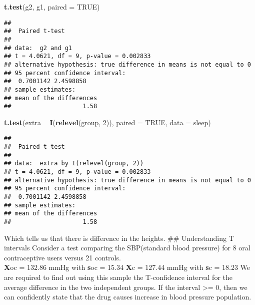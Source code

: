 \documentclass[
]{article}
\newenvironment{Shaded}{\begin{snugshade}}{\end{snugshade}}
\newcommand{\DataTypeTok}[1]{\textcolor[rgb]{0.13,0.29,0.53}{#1}}
\newcommand{\DecValTok}[1]{\textcolor[rgb]{0.00,0.00,0.81}{#1}}
\newcommand{\KeywordTok}[1]{\textcolor[rgb]{0.13,0.29,0.53}{\textbf{#1}}}
\newcommand{\NormalTok}[1]{#1}
\newcommand{\OperatorTok}[1]{\textcolor[rgb]{0.81,0.36,0.00}{\textbf{#1}}}
\newcommand{\OtherTok}[1]{\textcolor[rgb]{0.56,0.35,0.01}{#1}}
\newcommand{\StringTok}[1]{\textcolor[rgb]{0.31,0.60,0.02}{#1}}
\begin{document}
\begin{Shaded}
\begin{Highlighting}[]
\KeywordTok{t.test}\NormalTok{(g2, g1, }\DataTypeTok{paired =} \OtherTok{TRUE}\NormalTok{)}
\end{Highlighting}
\end{Shaded}

\begin{verbatim}
## 
##  Paired t-test
## 
## data:  g2 and g1
## t = 4.0621, df = 9, p-value = 0.002833
## alternative hypothesis: true difference in means is not equal to 0
## 95 percent confidence interval:
##  0.7001142 2.4598858
## sample estimates:
## mean of the differences 
##                    1.58
\end{verbatim}

\begin{Shaded}
\begin{Highlighting}[]
\KeywordTok{t.test}\NormalTok{(extra }\OperatorTok{~}\StringTok{ }\KeywordTok{I}\NormalTok{(}\KeywordTok{relevel}\NormalTok{(group, }\DecValTok{2}\NormalTok{)), }\DataTypeTok{paired =} \OtherTok{TRUE}\NormalTok{, }\DataTypeTok{data =}\NormalTok{ sleep)}
\end{Highlighting}
\end{Shaded}

\begin{verbatim}
## 
##  Paired t-test
## 
## data:  extra by I(relevel(group, 2))
## t = 4.0621, df = 9, p-value = 0.002833
## alternative hypothesis: true difference in means is not equal to 0
## 95 percent confidence interval:
##  0.7001142 2.4598858
## sample estimates:
## mean of the differences 
##                    1.58
\end{verbatim}

Which tells us that there is difference in the heights. \#\#
Understanding T intervals Consider a test comparing the SBP(standard
blood pressure) for 8 oral contraceptive users versus 21 controls.\\
\textbf{X}oc = 132.86 mmHg with \textbf{s}oc = 15.34 \textbf{X}c =
127.44 mmHg with \textbf{s}c = 18.23 We are required to find out using
this sample the T-confidence interval for the average difference in the
two independent groups. If the interval \textgreater= 0, then we can
confidently state that the drug causes increase in blood pressure
population.
\end{document}
